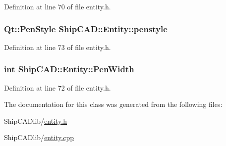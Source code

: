 Definition at line 70 of file entity.\-h.

\hypertarget{classShipCAD_1_1Entity_a8cbcbada188edd9d39e7c5743dc43560}{
\subsubsection[{penstyle}]{\setlength{\rightskip}{0pt plus 5cm}Qt\-::\-Pen\-Style Ship\-C\-A\-D\-::\-Entity\-::penstyle}}\label{classShipCAD_1_1Entity_a8cbcbada188edd9d39e7c5743dc43560}


Definition at line 73 of file entity.\-h.

\hypertarget{classShipCAD_1_1Entity_a95a1cc38c08e5b64a540727afb99d25a}{
\subsubsection[{Pen\-Width}]{\setlength{\rightskip}{0pt plus 5cm}int Ship\-C\-A\-D\-::\-Entity\-::\-Pen\-Width}}\label{classShipCAD_1_1Entity_a95a1cc38c08e5b64a540727afb99d25a}


Definition at line 72 of file entity.\-h.



The documentation for this class was generated from the following files\-:\begin{DoxyCompactItemize}
\item 
Ship\-C\-A\-Dlib/\hyperlink{entity_8h}{entity.\-h}\item 
Ship\-C\-A\-Dlib/\hyperlink{entity_8cpp}{entity.\-cpp}\end{DoxyCompactItemize}
